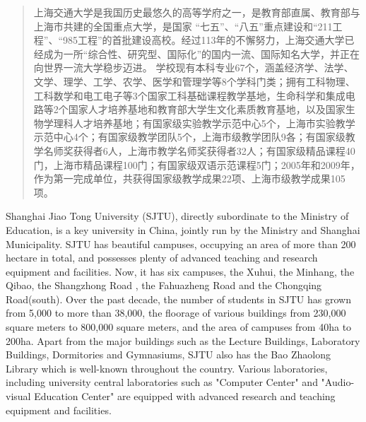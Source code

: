 \begin{abstract}

  上海交通大学是我国历史最悠久的高等学府之一，是教育部直属、教育部与上海市共建的全国重点大学，是国家 “七五”、“八五”重点建设和“211工程”、“985工程”的首批建设高校。经过113年的不懈努力，上海交通大学已经成为一所“综合性、研究型、国际化”的国内一流、国际知名大学，并正在向世界一流大学稳步迈进。
  学校现有本科专业67个，涵盖经济学、法学、文学、理学、工学、农学、医学和管理学等8个学科门类；拥有工科物理、工科数学和电工电子等3个国家工科基础课程教学基地，生命科学和集成电路等2个国家人才培养基地和教育部大学生文化素质教育基地，以及国家生物学理科人才培养基地；有国家级实验教学示范中心5个，上海市实验教学示范中心4个；有国家级教学团队5个，上海市级教学团队9各；有国家级教学名师奖获得者6人，上海市教学名师奖获得者32人；有国家级精品课程40门，上海市精品课程100门；有国家级双语示范课程5门；2005年和2009年，作为第一完成单位，共获得国家级教学成果22项、上海市级教学成果105项。

\end{abstract}

\begin{englishabstract}

  Shanghai Jiao Tong University (SJTU), directly subordinate to the Ministry of Education, is a key university in China, jointly run by the Ministry and Shanghai Municipality.
  SJTU has beautiful campuses, occupying an area of more than 200 hectare in total, and possesses plenty of advanced teaching and research equipment and facilities. Now, it has six campuses, the Xuhui, the Minhang, the Qibao, the Shangzhong Road , the Fahuazheng Road and the Chongqing Road(south). Over the past decade, the number of students in SJTU has grown from 5,000 to more than 38,000, the floorage of various buildings from 230,000 square meters to 800,000 square meters, and the area of campuses from 40ha to 200ha. Apart from the major buildings such as the Lecture Buildings, Laboratory Buildings, Dormitories and Gymnasiums, SJTU also has the Bao Zhaolong Library which is well-known throughout the country. Various laboratories, including university central laboratories such as "Computer Center" and "Audio-visual Education Center" are equipped with advanced research and teaching equipment and facilities.

\end{englishabstract}
